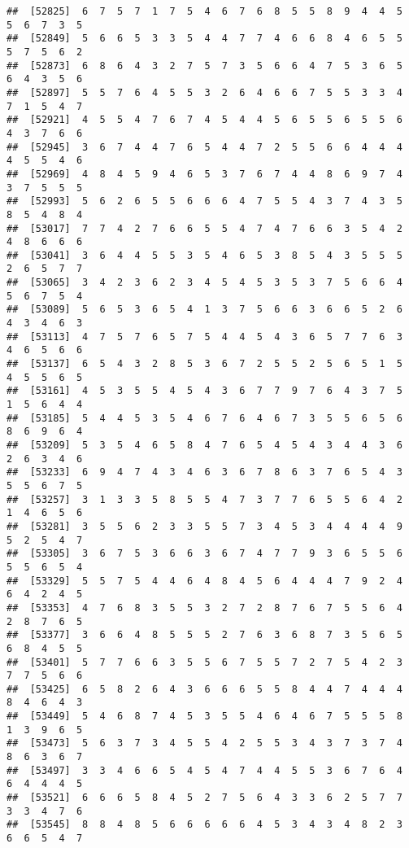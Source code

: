 \documentclass[
]{book}
\begin{document}
\begin{verbatim}
##  [52825]  6  7  5  7  1  7  5  4  6  7  6  8  5  5  8  9  4  4  5  5  6  7  3  5
##  [52849]  5  6  6  5  3  3  5  4  4  7  7  4  6  6  8  4  6  5  5  5  7  5  6  2
##  [52873]  6  8  6  4  3  2  7  5  7  3  5  6  6  4  7  5  3  6  5  6  4  3  5  6
##  [52897]  5  5  7  6  4  5  5  3  2  6  4  6  6  7  5  5  3  3  4  7  1  5  4  7
##  [52921]  4  5  5  4  7  6  7  4  5  4  4  5  6  5  5  6  5  5  6  4  3  7  6  6
##  [52945]  3  6  7  4  4  7  6  5  4  4  7  2  5  5  6  6  4  4  4  4  5  5  4  6
##  [52969]  4  8  4  5  9  4  6  5  3  7  6  7  4  4  8  6  9  7  4  3  7  5  5  5
##  [52993]  5  6  2  6  5  5  6  6  6  4  7  5  5  4  3  7  4  3  5  8  5  4  8  4
##  [53017]  7  7  4  2  7  6  6  5  5  4  7  4  7  6  6  3  5  4  2  4  8  6  6  6
##  [53041]  3  6  4  4  5  5  3  5  4  6  5  3  8  5  4  3  5  5  5  2  6  5  7  7
##  [53065]  3  4  2  3  6  2  3  4  5  4  5  3  5  3  7  5  6  6  4  5  6  7  5  4
##  [53089]  5  6  5  3  6  5  4  1  3  7  5  6  6  3  6  6  5  2  6  4  3  4  6  3
##  [53113]  4  7  5  7  6  5  7  5  4  4  5  4  3  6  5  7  7  6  3  4  6  5  6  6
##  [53137]  6  5  4  3  2  8  5  3  6  7  2  5  5  2  5  6  5  1  5  4  5  5  6  5
##  [53161]  4  5  3  5  5  4  5  4  3  6  7  7  9  7  6  4  3  7  5  1  5  6  4  4
##  [53185]  5  4  4  5  3  5  4  6  7  6  4  6  7  3  5  5  6  5  6  8  6  9  6  4
##  [53209]  5  3  5  4  6  5  8  4  7  6  5  4  5  4  3  4  4  3  6  2  6  3  4  6
##  [53233]  6  9  4  7  4  3  4  6  3  6  7  8  6  3  7  6  5  4  3  5  5  6  7  5
##  [53257]  3  1  3  3  5  8  5  5  4  7  3  7  7  6  5  5  6  4  2  1  4  6  5  6
##  [53281]  3  5  5  6  2  3  3  5  5  7  3  4  5  3  4  4  4  4  9  5  2  5  4  7
##  [53305]  3  6  7  5  3  6  6  3  6  7  4  7  7  9  3  6  5  5  6  5  5  6  5  4
##  [53329]  5  5  7  5  4  4  6  4  8  4  5  6  4  4  4  7  9  2  4  6  4  2  4  5
##  [53353]  4  7  6  8  3  5  5  3  2  7  2  8  7  6  7  5  5  6  4  2  8  7  6  5
##  [53377]  3  6  6  4  8  5  5  5  2  7  6  3  6  8  7  3  5  6  5  6  8  4  5  5
##  [53401]  5  7  7  6  6  3  5  5  6  7  5  5  7  2  7  5  4  2  3  7  7  5  6  6
##  [53425]  6  5  8  2  6  4  3  6  6  6  5  5  8  4  4  7  4  4  4  8  4  6  4  3
##  [53449]  5  4  6  8  7  4  5  3  5  5  4  6  4  6  7  5  5  5  8  1  3  9  6  5
##  [53473]  5  6  3  7  3  4  5  5  4  2  5  5  3  4  3  7  3  7  4  8  6  3  6  7
##  [53497]  3  3  4  6  6  5  4  5  4  7  4  4  5  5  3  6  7  6  4  6  4  4  4  5
##  [53521]  6  6  6  5  8  4  5  2  7  5  6  4  3  3  6  2  5  7  7  3  3  4  7  6
##  [53545]  8  8  4  8  5  6  6  6  6  6  4  5  3  4  3  4  8  2  3  6  6  5  4  7

\end{verbatim}
\end{document}
